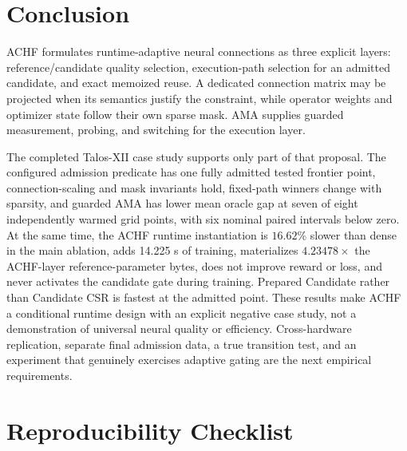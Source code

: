 \documentclass{article}
\newcommand{\achf}{\textsc{ACHF}}
\newcommand{\ama}{\textsc{AMA}}
\begin{document}
\section{Conclusion}

\achf{} formulates runtime-adaptive neural connections as three explicit
layers: reference/candidate quality selection, execution-path selection for an
admitted candidate, and exact memoized reuse. A dedicated connection matrix may
be projected when its semantics justify the constraint, while operator weights
and optimizer state follow their own sparse mask. \ama{} supplies guarded
measurement, probing, and switching for the execution layer.

The completed Talos-XII case study supports only part of that proposal. The
configured admission predicate has one fully admitted tested frontier point,
connection-scaling and mask invariants hold, fixed-path winners change with
sparsity, and guarded \ama{} has lower mean oracle gap at seven of eight
independently warmed grid points, with six nominal paired intervals below zero.
At the same time, the ACHF runtime instantiation is $16.62\%$ slower than dense
in the main ablation, adds 14.225 s of training, materializes
$4.23478\times$ the ACHF-layer reference-parameter bytes, does not improve
reward or loss, and never activates the candidate gate during training.
Prepared Candidate rather than Candidate CSR is fastest at the admitted point.
These results make ACHF a conditional runtime design with an explicit negative
case study, not a demonstration of universal neural quality or efficiency.
Cross-hardware replication, separate final admission data, a true transition
test, and an experiment that genuinely exercises adaptive gating are the next
empirical requirements.

\section*{Reproducibility Checklist}
\end{document}
